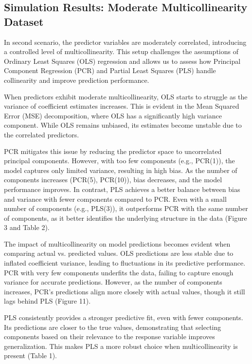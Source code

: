 \documentclass[11pt,twoside,a4paper]{article}
\begin{document}
\subsection{Simulation Results: Moderate Multicollinearity Dataset}  

In second scenario, the predictor variables are moderately correlated, introducing a controlled level of multicollinearity. This setup challenges the assumptions of Ordinary Least Squares (OLS) regression and allows us to assess how Principal Component Regression (PCR) and Partial Least Squares (PLS) handle collinearity and improve prediction performance.

When predictors exhibit moderate multicollinearity, OLS starts to struggle as the variance of coefficient estimates increases. This is evident in the Mean Squared Error (MSE) decomposition, where OLS has a significantly high variance component. While OLS remains unbiased, its estimates become unstable due to the correlated predictors.

PCR mitigates this issue by reducing the predictor space to uncorrelated principal components. However, with too few components (e.g., PCR(1)), the model captures only limited variance, resulting in high bias. As the number of components increases (PCR(5), PCR(10)), bias decreases, and the model performance improves. In contrast, PLS achieves a better balance between bias and variance with fewer components compared to PCR. Even with a small number of components (e.g., PLS(3)), it outperforms PCR with the same number of components, as it better identifies the underlying structure in the data (Figure 3 and Table 2).

The impact of multicollinearity on model predictions becomes evident when comparing actual vs. predicted values. OLS predictions are less stable due to inflated coefficient variance, leading to fluctuations in its predictive performance. PCR with very few components underfits the data, failing to capture enough variance for accurate predictions. However, as the number of components increases, PCR’s predictions align more closely with actual values, though it still lags behind PLS (Figure 11).

PLS consistently provides a stronger predictive fit, even with fewer components. Its predictions are closer to the true values, demonstrating that selecting components based on their relevance to the response variable improves generalization. This makes PLS a more robust choice when multicollinearity is present (Table 1).
\end{document}
